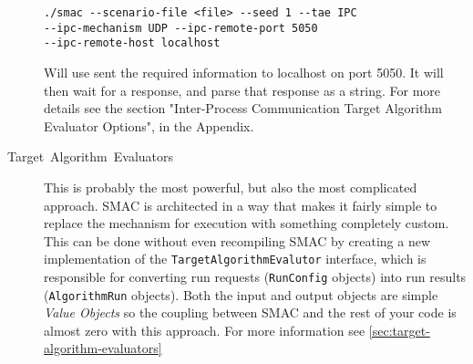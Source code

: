 \documentclass[manual.tex]{subfiles}
\begin{document}
\begin{description}
\begin{verbatim}
./smac --scenario-file <file> --seed 1 --tae IPC 
--ipc-mechanism UDP --ipc-remote-port 5050 
--ipc-remote-host localhost
\end{verbatim}

Will use sent the required information to localhost on port 5050. It will then wait for a response, and parse that response as a string. For more details see the section "Inter-Process Communication Target Algorithm Evaluator Options", in the Appendix.


\item [{Target~Algorithm~Evaluators}]	This is probably the most powerful, but also the most complicated approach. SMAC is architected in a way that makes it fairly simple to replace the mechanism for execution with something completely custom. This can be done without even recompiling SMAC by creating a new implementation of the \texttt{TargetAlgorithmEvalutor} interface, which is responsible for converting run requests (\texttt{RunConfig} objects) into run results (\texttt{AlgorithmRun} objects). Both the input and output objects are simple \emph{Value Objects} so the coupling between SMAC and the rest of your code is almost zero with this approach.  For more information see \ref{sec:target-algorithm-evaluators}


\end{description}
\end{document}
